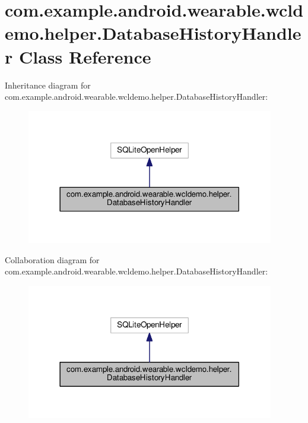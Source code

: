 \hypertarget{classcom_1_1example_1_1android_1_1wearable_1_1wcldemo_1_1helper_1_1DatabaseHistoryHandler}{}\section{com.\+example.\+android.\+wearable.\+wcldemo.\+helper.\+Database\+History\+Handler Class Reference}
\label{classcom_1_1example_1_1android_1_1wearable_1_1wcldemo_1_1helper_1_1DatabaseHistoryHandler}


Inheritance diagram for com.\+example.\+android.\+wearable.\+wcldemo.\+helper.\+Database\+History\+Handler\+:
\nopagebreak
\begin{figure}[H]
\begin{center}
\leavevmode
\includegraphics[width=306pt]{d3/dc8/classcom_1_1example_1_1android_1_1wearable_1_1wcldemo_1_1helper_1_1DatabaseHistoryHandler__inherit__graph}
\end{center}
\end{figure}


Collaboration diagram for com.\+example.\+android.\+wearable.\+wcldemo.\+helper.\+Database\+History\+Handler\+:
\nopagebreak
\begin{figure}[H]
\begin{center}
\leavevmode
\includegraphics[width=306pt]{d2/dea/classcom_1_1example_1_1android_1_1wearable_1_1wcldemo_1_1helper_1_1DatabaseHistoryHandler__coll__graph}
\end{center}
\end{figure}
